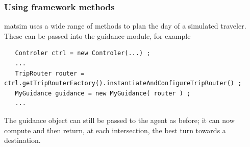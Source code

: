 
\subsubsection{Using framework methods}

\acrshort{matsim} uses a wide range of methods to plan the day of a simulated traveler.  These can be passed into the guidance module, for example
\begin{lstlisting}
   Controler ctrl = new Controler(...) ;
   ...
   TripRouter router = ctrl.getTripRouterFactory().instantiateAndConfigureTripRouter() ;
   MyGuidance guidance = new MyGuidance( router ) ;
   ...
\end{lstlisting}
The guidance object can still be passed to the agent as before; it can now compute and then return, at each intersection, the best turn towards a destination.





